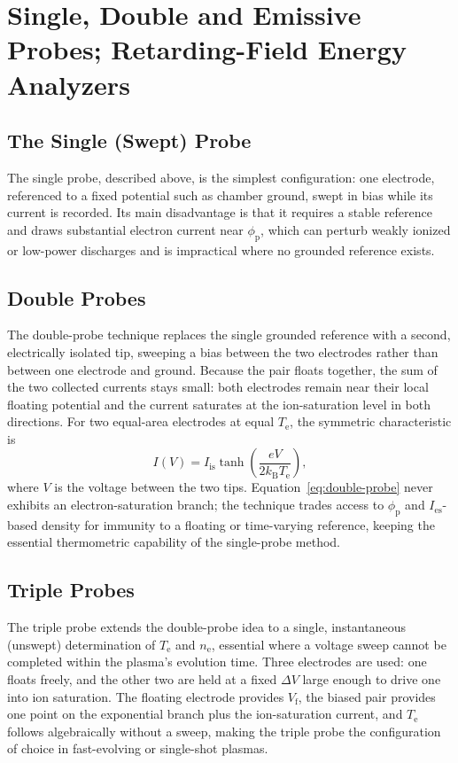 \section{Single, Double and Emissive Probes; Retarding-Field Energy Analyzers}
\label{sec:probes-variants}

\subsection{The Single (Swept) Probe}

The single probe, described above, is the simplest configuration: one electrode, referenced to a fixed potential such as chamber ground, swept in bias while its current is recorded. Its main disadvantage is that it requires a stable reference and draws substantial electron current near $\phi_{\mathrm{p}}$, which can perturb weakly ionized or low-power discharges and is impractical where no grounded reference exists.

\subsection{Double Probes}

The double-probe technique replaces the single grounded reference with a second, electrically isolated tip, sweeping a bias between the two electrodes rather than between one electrode and ground. Because the pair floats together, the sum of the two collected currents stays small: both electrodes remain near their local floating potential and the current saturates at the ion-saturation level in both directions. For two equal-area electrodes at equal $T_{\mathrm{e}}$, the symmetric characteristic is
\begin{equation}
I(V) = I_{\mathrm{is}} \tanh\!\left(\frac{eV}{2 k_{\mathrm{B}} T_{\mathrm{e}}}\right),
\label{eq:double-probe}
\end{equation}
where $V$ is the voltage between the two tips. Equation~\eqref{eq:double-probe} never exhibits an electron-saturation branch; the technique trades access to $\phi_{\mathrm{p}}$ and $I_{\mathrm{es}}$-based density for immunity to a floating or time-varying reference, keeping the essential thermometric capability of the single-probe method.

\subsection{Triple Probes}

The triple probe extends the double-probe idea to a single, instantaneous (unswept) determination of $T_{\mathrm{e}}$ and $n_{\mathrm{e}}$, essential where a voltage sweep cannot be completed within the plasma's evolution time. Three electrodes are used: one floats freely, and the other two are held at a fixed $\Delta V$ large enough to drive one into ion saturation. The floating electrode provides $V_{\mathrm{f}}$, the biased pair provides one point on the exponential branch plus the ion-saturation current, and $T_{\mathrm{e}}$ follows algebraically without a sweep, making the triple probe the configuration of choice in fast-evolving or single-shot plasmas.

